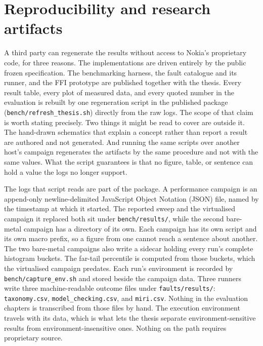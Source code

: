 \documentclass[english,oneside,a4paper,censored,csm,software-track-2020]{HYthesisML}
\begin{document}
\section{Reproducibility and research artifacts}\label{sec:repro}
A third party can regenerate the results without access to Nokia's proprietary code, for
three reasons. The implementations are driven entirely by the public frozen specification. The
benchmarking harness, the fault catalogue and its runner, and the FFI prototype are published
together with the thesis. Every result table, every plot of measured data, and every quoted
number in the evaluation is rebuilt by one regeneration script in the published package
(\texttt{bench/refresh\_thesis.sh}) directly from the raw logs. The scope of that claim is
worth stating precisely. Two things it might be read to cover are outside it. The hand-drawn
schematics that explain a concept rather than report a result are authored and not generated.
And running the same scripts over another host's campaign regenerates the artifacts by the
same procedure and not with the same values. What the script guarantees is that no figure,
table, or sentence can hold a value the logs no longer support.

The logs that script reads are part of the package. A performance campaign is an append-only
newline-delimited JavaScript Object Notation (JSON) file, named by the timestamp at which it
started. The reported sweep and the virtualised campaign it replaced both sit under
\texttt{bench/results/}, while the second bare-metal campaign has a directory of its own. Each
campaign has its own script and its own macro prefix, so a figure from one cannot reach a
sentence about another. The two bare-metal campaigns also write a sidecar holding every run's
complete histogram buckets. The far-tail percentile is computed from those buckets, which the
virtualised campaign predates. Each run's environment is recorded by
\texttt{bench/capture\_env.sh} and stored beside the campaign data. Three runners write three
machine-readable outcome files under \texttt{faults/results/}: \texttt{taxonomy.csv},
\texttt{model\_checking.csv}, and \texttt{miri.csv}. Nothing in the evaluation chapters is
transcribed from those files by hand. The execution environment travels with its data, which
is what lets the thesis separate environment-sensitive results from environment-insensitive
ones. Nothing on the path requires proprietary source.
\end{document}
